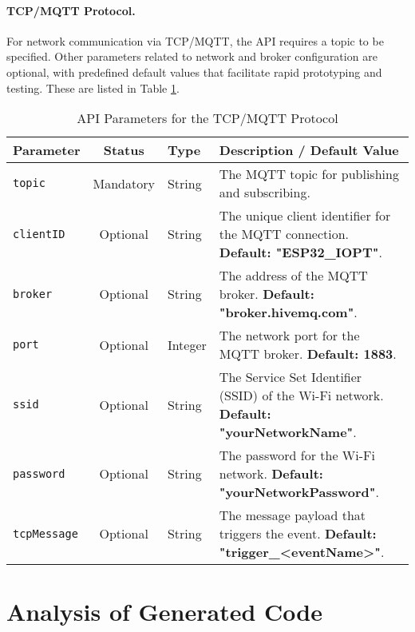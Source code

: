 \paragraph{TCP/MQTT Protocol.} For network communication via TCP/MQTT, the API requires a topic to be specified. Other parameters related to network and broker configuration are optional, with predefined default values that facilitate rapid prototyping and testing. These are listed in Table \ref{tab:tcp_params}.

\begin{table}[h!]
    \centering
    \caption{API Parameters for the TCP/MQTT Protocol}
    \label{tab:tcp_params}
    \begin{tabular}{|l|c|l|p{6cm}|}
        \hline
        \textbf{Parameter} & \textbf{Status} & \textbf{Type} & \textbf{Description / Default Value} \\ \hline
        \texttt{topic} & Mandatory & String & The MQTT topic for publishing and subscribing. \\ \hline
        \texttt{clientID} & Optional & String & The unique client identifier for the MQTT connection. \textbf{Default: "ESP32\_IOPT"}. \\ \hline
        \texttt{broker} & Optional & String & The address of the MQTT broker. \textbf{Default: "broker.hivemq.com"}. \\ \hline
        \texttt{port} & Optional & Integer & The network port for the MQTT broker. \textbf{Default: 1883}. \\ \hline
        \texttt{ssid} & Optional & String & The Service Set Identifier (SSID) of the Wi-Fi network. \textbf{Default: "yourNetworkName"}. \\ \hline
        \texttt{password} & Optional & String & The password for the Wi-Fi network. \textbf{Default: "yourNetworkPassword"}. \\ \hline
        \texttt{tcpMessage} & Optional & String & The message payload that triggers the event. \textbf{Default: "trigger\_<eventName>"}. \\ \hline
    \end{tabular}
\end{table}



\section{Analysis of Generated Code}
\label{sec:code_analysis}

